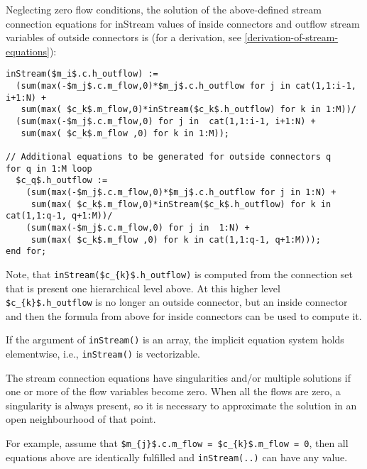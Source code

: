 Neglecting zero flow conditions, the solution of the above-defined
stream connection equations for inStream values of inside connectors and
outflow stream variables of outside connectors is (for a derivation, see
\autoref{derivation-of-stream-equations}):
\begin{lstlisting}[language=modelica,mathescape=true]
inStream($m_i$.c.h_outflow) :=
  (sum(max(-$m_j$.c.m_flow,0)*$m_j$.c.h_outflow for j in cat(1,1:i-1, i+1:N) +
   sum(max( $c_k$.m_flow,0)*inStream($c_k$.h_outflow) for k in 1:M))/
  (sum(max(-$m_j$.c.m_flow,0) for j in  cat(1,1:i-1, i+1:N) +
   sum(max( $c_k$.m_flow ,0) for k in 1:M));

// Additional equations to be generated for outside connectors q
for q in 1:M loop
  $c_q$.h_outflow :=
    (sum(max(-$m_j$.c.m_flow,0)*$m_j$.c.h_outflow for j in 1:N) +
     sum(max( $c_k$.m_flow,0)*inStream($c_k$.h_outflow) for k in cat(1,1:q-1, q+1:M))/
    (sum(max(-$m_j$.c.m_flow,0) for j in  1:N) +
     sum(max( $c_k$.m_flow ,0) for k in cat(1,1:q-1, q+1:M)));
end for;
\end{lstlisting}

\begin{nonnormative}
Note, that \lstinline!inStream($c_{k}$.h_outflow)! is computed from the connection set that is present one hierarchical level above.  At this higher level
\lstinline!$c_{k}$.h_outflow! is no longer an outside connector, but an inside connector and then the formula from above for inside connectors can be used
to compute it.
\end{nonnormative}

If the argument of \lstinline!inStream()! is an array, the implicit
equation system holds elementwise, i.e., \lstinline!inStream()! is
vectorizable.

The stream connection equations have singularities and/or multiple
solutions if one or more of the flow variables become zero. When all the
flows are zero, a singularity is always present, so it is necessary to
approximate the solution in an open neighbourhood of that point.

\begin{nonnormative}
For example, assume that \lstinline!$m_{j}$.c.m_flow = $c_{k}$.m_flow = 0!, then all equations above are identically fulfilled and \lstinline!inStream(..)! can have any value.
\end{nonnormative}

